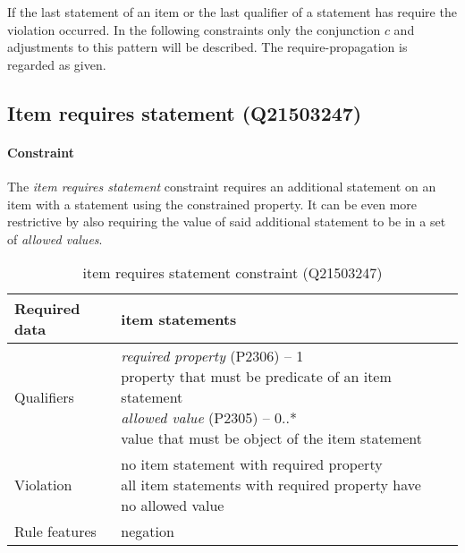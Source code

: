 \documentclass[hyperref,bachelorofscience,fleqn]{cgvpub}
\begin{document}
If the last statement of an item or the last qualifier of a statement has require the violation occurred. In the following constraints only the conjunction \(c\) and adjustments to this pattern will be described. The require-propagation is regarded as given.

\subsection{Item requires statement (Q21503247)}\label{subsec_2_item_requires_statement}
\paragraph{Constraint}
The \emph{item requires statement} constraint requires an additional statement on an item with a statement using the constrained property. It can be even more restrictive by also requiring the value of said additional statement to be in a set of \emph{allowed values}.
\begin{table}[H]
\caption{item requires statement constraint (Q21503247)}\label{tab_item_requires_statements}
\begin{tabularx}{\textwidth}{ ll X}
\hline
Required data & item statements \\
\hline
Qualifiers & \makecell{\emph{required property} (P2306) -- 1 \\ property that must be predicate of an item statement \\
\emph{allowed value} (P2305) -- 0..* \\ value that must be object of the item statement} \\
\hline
Violation & \makecell{no item statement with required property \\ all item statements with required property have no allowed value} \\
\hline
Rule features & negation \\
\hline
\end{tabularx}
\end{table}
\end{document}
